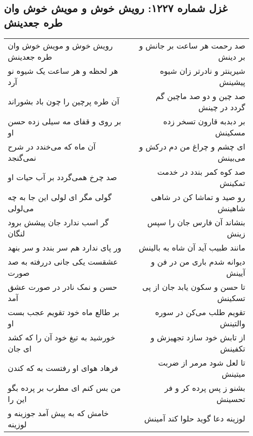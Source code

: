 \begin{center}
\section*{غزل شماره ۱۲۲۷: رویش خوش و مویش خوش وان طره جعدینش}
\label{sec:1227}
\begin{longtable}{l p{0.5cm} r}
رویش خوش و مویش خوش وان طره جعدینش
&&
صد رحمت هر ساعت بر جانش و بر دینش
\\
هر لحظه و هر ساعت یک شیوه نو آرد
&&
شیرینتر و نادرتر زان شیوه پیشینش
\\
آن طره پرچین را چون باد بشوراند
&&
صد چین و دو صد ماچین گم گردد در چینش
\\
بر روی و قفای مه سیلی زده حسن او
&&
بر دبدبه قارون تسخر زده مسکینش
\\
آن ماه که می‌خندد در شرح نمی‌گنجد
&&
ای چشم و چراغ من دم درکش و می‌بینش
\\
صد چرخ همی‌گردد بر آب حیات او
&&
صد کوه کمر بندد در خدمت تمکینش
\\
گولی مگر ای لولی این جا به چه می‌لولی
&&
رو صید و تماشا کن در شاهی شاهینش
\\
گر اسب ندارد جان پیشش برود لنگان
&&
بنشاند آن فارس جان را سپس زینش
\\
ور پای ندارد هم سر بندد و سر بنهد
&&
مانند طبیب آید آن شاه به بالینش
\\
عشقست یکی جانی دررفته به صد صورت
&&
دیوانه شدم باری من در فن و آیینش
\\
حسن و نمک نادر در صورت عشق آمد
&&
تا حسن و سکون یابد جان از پی تسکینش
\\
بر طالع ماه خود تقویم عجب بست او
&&
تقویم طلب می‌کن در سوره والتینش
\\
خورشید به تیغ خود آن را که کشد ای جان
&&
از تابش خود سازد تجهیزش و تکفینش
\\
فرهاد هوای او رفتست به که کندن
&&
تا لعل شود مرمر از ضربت میتینش
\\
من بس کنم ای مطرب بر پرده بگو این را
&&
بشنو ز پس پرده کر و فر تحسینش
\\
خامش که به پیش آمد جوزینه و لوزینه
&&
لوزینه دعا گوید حلوا کند آمینش
\\
\end{longtable}
\end{center}
